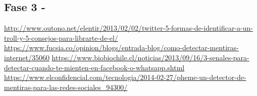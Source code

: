 \documentclass[../all.tex]{subfiles}
\begin{document}
\newpage
\subsection{Fase 3 -}

\url{http://www.outono.net/elentir/2013/02/02/twitter-5-formas-de-identificar-a-un-troll-y-5-consejos-para-librarte-de-el/}
\url{https://www.fucsia.co/opinion/blogs/entrada-blog/como-detectar-mentiras-internet/35060}
\url{https://www.biobiochile.cl/noticias/2013/09/16/3-senales-para-detectar-cuando-te-mienten-en-facebook-o-whatsapp.shtml}
\url{https://www.elconfidencial.com/tecnologia/2014-02-27/pheme-un-detector-de-mentiras-para-las-redes-sociales_94300/}
\end{document}
